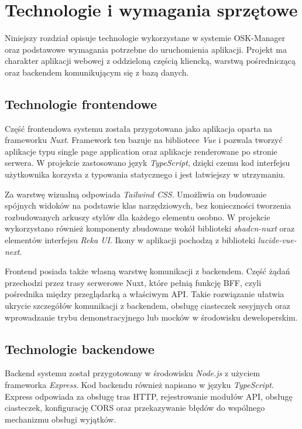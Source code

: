 \chapter{Technologie i wymagania sprzętowe}
\label{cha:technologie}

Niniejszy rozdział opisuje technologie wykorzystane w systemie OSK-Manager oraz podstawowe wymagania potrzebne do uruchomienia aplikacji. Projekt ma charakter aplikacji webowej z oddzieloną częścią kliencką, warstwą pośredniczącą oraz backendem komunikującym się z bazą danych.

\section{Technologie frontendowe}
\label{sec:technologie-frontend}

Część frontendowa systemu została przygotowana jako aplikacja oparta na frameworku \textit{Nuxt}. Framework ten bazuje na bibliotece \textit{Vue} i pozwala tworzyć aplikacje typu single page application oraz aplikacje renderowane po stronie serwera. W projekcie zastosowano język \textit{TypeScript}, dzięki czemu kod interfejsu użytkownika korzysta z typowania statycznego i jest łatwiejszy w utrzymaniu.

Za warstwę wizualną odpowiada \textit{Tailwind CSS}. Umożliwia on budowanie spójnych widoków na podstawie klas narzędziowych, bez konieczności tworzenia rozbudowanych arkuszy stylów dla każdego elementu osobno. W projekcie wykorzystano również komponenty zbudowane wokół biblioteki \textit{shadcn-nuxt} oraz elementów interfejsu \textit{Reka UI}. Ikony w aplikacji pochodzą z biblioteki \textit{lucide-vue-next}.

Frontend posiada także własną warstwę komunikacji z backendem. Część żądań przechodzi przez trasy serwerowe Nuxt, które pełnią funkcję BFF, czyli pośrednika między przeglądarką a właściwym API. Takie rozwiązanie ułatwia ukrycie szczegółów komunikacji z backendem, obsługę ciasteczek sesyjnych oraz wprowadzanie trybu demonstracyjnego lub mocków w środowisku deweloperskim.

\section{Technologie backendowe}
\label{sec:technologie-backend}

Backend systemu został przygotowany w środowisku \textit{Node.js} z użyciem frameworka \textit{Express}. Kod backendu również napisano w języku \textit{TypeScript}. Express odpowiada za obsługę tras HTTP, rejestrowanie modułów API, obsługę ciasteczek, konfigurację CORS oraz przekazywanie błędów do wspólnego mechanizmu obsługi wyjątków.

